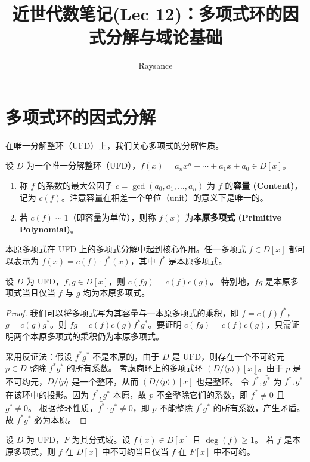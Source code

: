 \documentclass[11pt]{article}
\title{近世代数笔记(Lec 12)：多项式环的因式分解与域论基础}
\author{Raysance}
\date{}
\begin{document}
\maketitle

\section{多项式环的因式分解}

在唯一分解整环（UFD）上，我们关心多项式的分解性质。

\begin{cndefinition}[容量与本原多项式]
设 $D$ 为一个唯一分解整环（UFD），$f(x) = a_n x^n + \cdots + a_1 x + a_0 \in D[x]$。
\begin{enumerate}
    \item 称 $f$ 的系数的最大公因子 $c = \gcd(a_0, a_1, \dots, a_n)$ 为 $f$ 的\textbf{容量 (Content)}，记为 $c(f)$。注意容量在相差一个单位（unit）的意义下是唯一的。
    \item 若 $c(f) \sim 1$（即容量为单位），则称 $f(x)$ 为\textbf{本原多项式 (Primitive Polynomial)}。
\end{enumerate}
\end{cndefinition}

本原多项式在 UFD 上的多项式分解中起到核心作用。任一多项式 $f \in D[x]$ 都可以表示为 $f(x) = c(f) \cdot f^*(x)$，其中 $f^*$ 是本原多项式。

\begin{cnproperty}[容量的乘法性质]
设 $D$ 为 UFD，$f, g \in D[x]$，则 $c(fg) = c(f)c(g)$。
特别地，$fg$ 是本原多项式当且仅当 $f$ 与 $g$ 均为本原多项式。
\end{cnproperty}
\begin{proof}
我们可以将多项式写为其容量与一本原多项式的乘积，即 $f = c(f)f^*$，$g = c(g)g^*$。则 $fg = c(f)c(g) f^*g^*$。要证明 $c(fg) = c(f)c(g)$，只需证明两个本原多项式的乘积仍为本原多项式。

采用反证法：假设 $f^*g^*$ 不是本原的，由于 $D$ 是 UFD，则存在一个不可约元 $p \in D$ 整除 $f^*g^*$ 的所有系数。
考虑商环上的多项式环 $(D/\langle p \rangle)[x]$。由于 $p$ 是不可约元，$D/\langle p \rangle$ 是一个整环，从而 $(D/\langle p \rangle)[x]$ 也是整环。
令 $\bar{f^*}, \bar{g^*}$ 为 $f^*, g^*$ 在该环中的投影。因为 $f^*, g^*$ 本原，故 $p$ 不全整除它们的系数，即 $\bar{f^*} \neq 0$ 且 $\bar{g^*} \neq 0$。
根据整环性质，$\bar{f^*} \cdot \bar{g^*} \neq 0$，即 $p$ 不能整除 $f^*g^*$ 的所有系数，产生矛盾。故 $f^*g^*$ 必为本原。
\end{proof}

\begin{cnlemma}
设 $D$ 为 UFD，$F$ 为其分式域。设 $f(x) \in D[x]$ 且 $\deg(f) \ge 1$。
若 $f$ 是本原多项式，则 $f$ 在 $D[x]$ 中不可约当且仅当 $f$ 在 $F[x]$ 中不可约。
\end{cnlemma}
\end{document}
